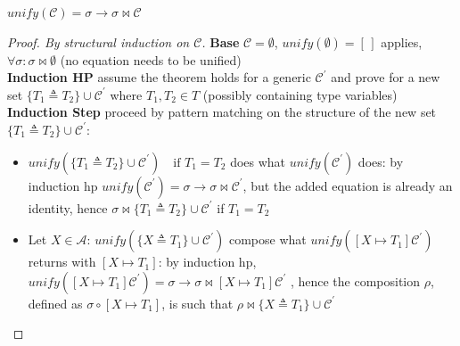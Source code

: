 \documentclass[8pt]{beamer}
\begin{document}
\begin{frame}
    \begin{theorem}
        $unify(\mathcal{C}) = \sigma \rightarrow \sigma \Join \mathcal{C}$
    \end{theorem}
    \footnotesize
    \begin{proof}[Proof. By structural induction on $\mathcal{C}$]
    \textbf{Base} $\mathcal{C} = \emptyset$, 
        $unify(\emptyset) = [\,]$ applies, 
        $\forall\sigma: \sigma \Join \emptyset$ (no equation needs 
        to be unified)\\
    \textbf{Induction HP} assume the theorem holds for a generic
        $\mathcal{C}^{\prime}$ and prove for a new set 
        $\{T_1 \triangleq T_2\} \cup \mathcal{C}^{\prime}$
        where $T_1,T_2 \in T$ (possibly containing type variables) \\
    \textbf{Induction Step} proceed by pattern matching on the 
        structure of the new set $\{T_1 \triangleq T_2\} \cup 
        \mathcal{C}^{\prime}$: 
        \begin{itemize}
            \item $unify(\{T_1 \triangleq T_2\} \cup \mathcal{C}^{\prime})
                \quad \text{if } T_1 = T_2$ does what 
                $unify(\mathcal{C}^{\prime})$ does: by induction hp 
                $unify(\mathcal{C}^{\prime}) = \sigma \rightarrow
                \sigma \Join \mathcal{C}^{\prime}$, but the added equation
                is already an identity, hence $\sigma \Join 
                \{T_1 \triangleq T_2\} \cup \mathcal{C}^{\prime}$ 
                if $ T_1 = T_2$

            \item Let $X \in \mathcal{A}$: $unify(\{X \triangleq T_1\}
            \cup \mathcal{C}^{\prime})$
            compose what $unify([ X \mapsto T_1]\mathcal{C}^{\prime})$ 
            returns with $[X \mapsto T_1]$: by induction hp, 
            $unify([ X \mapsto T_1]\mathcal{C}^{\prime}) = \sigma
            \rightarrow \sigma \Join [ X \mapsto T_1]\mathcal{C}^{\prime}$
            , hence the composition $\rho$, defined as 
            $\sigma \circ [ X \mapsto T_1]$, is such that $\rho \Join
            \{X \triangleq T_1\} \cup \mathcal{C}^{\prime}$


\end{itemize}
\end{proof}
\end{frame}
\end{document}
